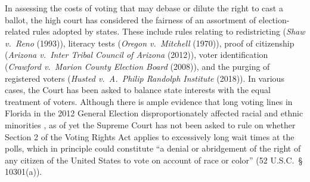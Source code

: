 \documentclass[12pt,titlepage]{article}
\begin{document}
In assessing the costs of voting that may debase or dilute the right
to cast a ballot, the high court has considered the fairness of an
assortment of election-related rules adopted by states.  These include
rules relating to redistricting (\emph{Shaw v.\ Reno} (1993)),
literacy tests (\emph{Oregon v.\ Mitchell} (1970)), proof of
citizenship (\emph{Arizona v.\ Inter Tribal Council of Arizona}
(2012)), voter identification (\emph{Crawford v.\ Marion County
  Election Board} (2008)), and the purging of registered voters
(\emph{Husted v.\ A.\ Philip Randolph Institute} (2018)). In various
cases, the Court has been asked to balance state interests with the
equal treatment of voters.  Although there is ample evidence that long
voting lines in Florida in the 2012 General Election
disproportionately affected racial and ethnic minorities
\citep{herron_smith2014}, as of yet the Supreme Court has not been
asked to rule on whether Section 2 of the Voting Rights Act applies to
excessively long wait times at the polls, which in principle could
constitute ``a denial or abridgement of the right of any citizen of
the United States to vote on account of race or color'' (52 U.S.C.\ \S
10301(a)).
\end{document}
